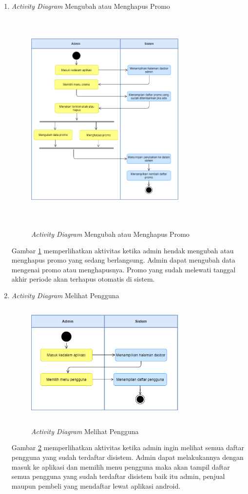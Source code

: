 \begin{enumerate}
	\newpage
	\item \textit{Activity Diagram} Mengubah atau Menghapus Promo
	\begin{figure}[H]
		\centering
		{\includegraphics [width = 8cm, height= 11cm]{gambar/activity diagram/ubah atau hapus promo}}
		\caption{\textit{Activity Diagram} Mengubah atau Menghapus Promo}
		\label{ubah atau hapus promo}
	\end{figure}
	\par Gambar \ref*{ubah atau hapus promo} memperlihatkan aktivitas ketika admin hendak mengubah atau menghapus promo yang sedang berlangsung. Admin dapat mengubah data mengenai promo atau menghapusnya. Promo yang sudah melewati tanggal akhir periode akan terhapus otomatis di sistem.

	\item \textit{Activity Diagram} Melihat Pengguna
	\begin{figure}[H]
		\centering
		{\includegraphics [width = 8cm, height= 6cm]{gambar/activity diagram/lihat pengguna}}
		\caption{\textit{Activity Diagram} Melihat Pengguna}
		\label{lihat pengguna}
	\end{figure}
	\par Gambar \ref*{lihat pengguna} memperlihatkan aktivitas ketika admin ingin melihat semua daftar pengguna yang sudah terdaftar disistem. Admin dapat melakukannya dengan masuk ke aplikasi dan memilih menu pengguna maka akan tampil daftar semua pengguna yang sudah terdaftar disistem baik itu admin, penjual maupun pembeli yang mendaftar lewat aplikasi android.


\end{enumerate}
